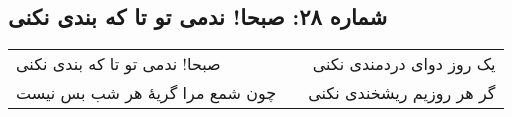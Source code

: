 \begin{center}
\section*{شماره ۲۸: صبحا! ندمی تو تا که بندی نکنی}
\label{sec:028}
\begin{longtable}{l p{0.5cm} r}
صبحا! ندمی تو تا که بندی نکنی
&&
یک روز دوای دردمندی نکنی
\\
چون شمع مرا گریهٔ هر شب بس نیست
&&
گر هر روزیم ریشخندی نکنی
\\
\end{longtable}
\end{center}
